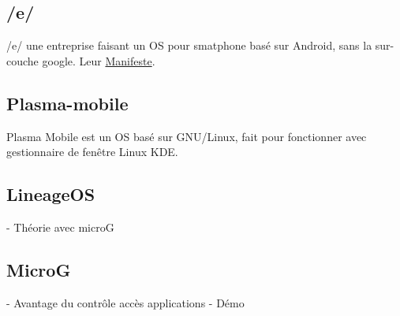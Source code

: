\documentclass[aspectratio=169]{beamer}
\begin{document}
\subsection{/e/}
\begin{frame}
/e/ une entreprise faisant un OS pour smatphone basé sur Android, sans la sur-couche google.\newline
\newline
Leur \href{https://e.foundation/wp-content/uploads/ManifesteFR.pdf}{Manifeste}.
\end{frame}

\subsection{Plasma-mobile}
\begin{frame}
Plasma Mobile est un OS basé sur GNU/Linux, fait pour fonctionner avec gestionnaire de fenêtre Linux KDE.
\end{frame}

\subsection{LineageOS}
\begin{frame}
- Théorie avec microG
\end{frame}
\subsection{MicroG}
\begin{frame}
- Avantage du contrôle accès applications
- Démo
\end{frame}
\end{document}

